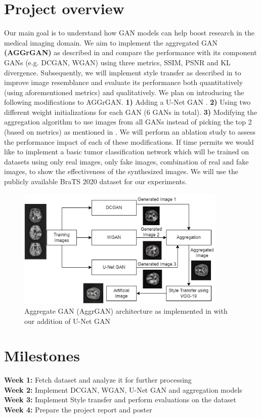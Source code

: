 \documentclass[10pt]{extarticle}
\begin{document}
\section{Project overview}

Our main goal is to understand how GAN models can help boost research in the medical imaging domain. We aim to implement the
aggregated GAN \textbf{(AGGrGAN)} as described in \cite{Mukherkjee2022} and compare the performance with its component GANs 
(e.g. DCGAN, WGAN) using three metrics, SSIM, PSNR and KL divergence. Subsequently, we will implement style transfer as 
described in \cite{Mukherkjee2022} to improve image resemblance and evaluate its performance both quantitatively (using 
aforementioned metrics) and qualitatively. We plan on introducing the following modifications to AGGrGAN. \textbf{1)} Adding 
a U-Net GAN \cite{Edgar2020}. \textbf{2)} Using two different weight initializations for each GAN (6 GANs in total). \textbf
{3)} Modifying the aggregation algorithm to use images from all GANs instead of picking the top 2 (based on metrics) as 
mentioned in \cite{Mukherkjee2022}. We will perform an ablation study to assess the performance impact of each of these 
modifications. If time permits we would like to implement a basic tumor classification network which will be trained on 
datasets using only real images, only fake images, combination of real and fake images, to show the effectiveness of the 
synthesized images. We will use the publicly available BraTS 2020 \cite{Menze2015} \cite{Bakas2017} \cite{Bakas2018} dataset for our experiments.

\begin{figure} %
  \centering
  \includegraphics[width=10cm]{AggrGAN_architecture.png}
  \caption{Aggregate GAN (AggrGAN) architecture as implemented in \cite{Mukherkjee2022} with our addition of U-Net GAN}
  \label{AggrGAN_architecture}
\end{figure}

\section{Milestones}

\textbf{Week 1:} Fetch dataset and analyze it for further processing \\
\textbf{Week 2:} Implement DCGAN, WGAN, U-Net GAN and aggregation models \\
\textbf{Week 3:} Implement Style transfer and perform evaluations on the dataset \\
\textbf{Week 4:} Prepare the project report and poster



\end{document}
